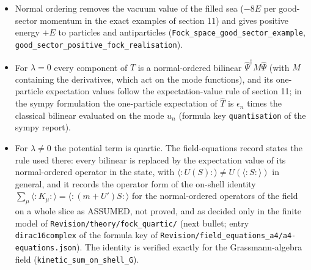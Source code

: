 \documentclass[11pt]{article}
\begin{document}
\begin{itemize}
\item Normal ordering removes the vacuum value of the filled sea ($-8E$ per good-sector momentum in the exact examples of section 11) and gives positive energy $+E$ to particles and antiparticles (\texttt{Fock\_spa\allowbreak{}ce\_good\_\allowbreak{}sector\_e\allowbreak{}xample}, \texttt{good\_sec\allowbreak{}tor\_posi\allowbreak{}tive\_foc\allowbreak{}k\_realis\allowbreak{}ation}).
\item For $\lambda = 0$ every component of $\hat T$ is a normal-ordered bilinear $\hat\Psi^\dagger M\hat\Psi$ (with $M$ containing the derivatives, which act on the mode functions), and its one-particle expectation values follow the expectation-value rule of section 11; in the sympy formulation the one-particle expectation of $\hat T$ is $\epsilon_n$ times the classical bilinear evaluated on the mode $u_n$ (formula key \texttt{quantisa\allowbreak{}tion} of the sympy report).
\item For $\lambda \neq 0$ the potential term is quartic. The field-equations record states the rule used there: every bilinear is replaced by the expectation value of its normal-ordered operator in the state, with $\langle{:}U(S){:}\rangle \neq U(\langle{:}S{:}\rangle)$ in general, and it records the operator form of the on-shell identity $\sum_\mu\langle{:}K_\mu{:}\rangle = \langle{:}(m + U')S{:}\rangle$ for the normal-ordered operators of the field on a whole slice as ASSUMED, not proved, and as decided only in the finite model of \texttt{Revision\allowbreak{}/theory/\allowbreak{}fock\_qua\allowbreak{}rtic/} (next bullet; entry \texttt{dirac16c\allowbreak{}omplex} of the formula key \texttt{} of \texttt{Revision\allowbreak{}/field\_e\allowbreak{}quations\allowbreak{}\_a4/a4-e\allowbreak{}quations\allowbreak{}.json}). The identity is verified exactly for the Grassmann-algebra field (\texttt{kinetic\_\allowbreak{}sum\_on\_s\allowbreak{}hell\_G}).

\end{itemize}
\end{document}
